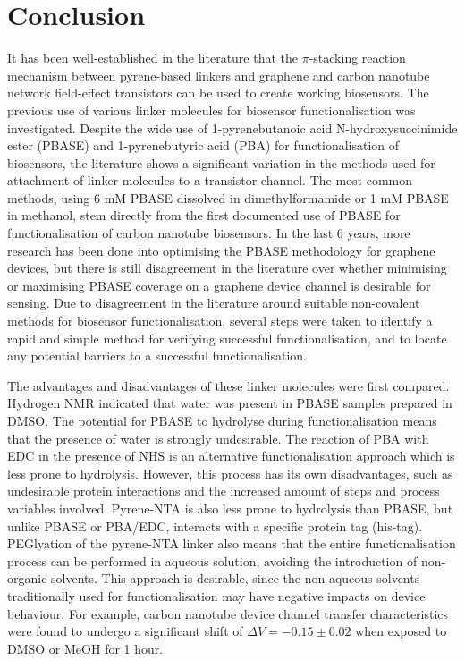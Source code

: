 \documentclass[
  a4paper,
]{scrbook}
\begin{document}
\hypertarget{sec-conclusion}{%
\section{Conclusion}\label{sec-conclusion}}

It has been well-established in the literature that the \(\pi\)-stacking
reaction mechanism between pyrene-based linkers and graphene and carbon
nanotube network field-effect transistors can be used to create working
biosensors. The previous use of various linker molecules for biosensor
functionalisation was investigated. Despite the wide use of
1-pyrenebutanoic acid N-hydroxysuccinimide ester (PBASE) and
1-pyrenebutyric acid (PBA) for functionalisation of biosensors, the
literature shows a significant variation in the methods used for
attachment of linker molecules to a transistor channel. The most common
methods, using 6 mM PBASE dissolved in dimethylformamide or 1 mM PBASE
in methanol, stem directly from the first documented use of PBASE for
functionalisation of carbon nanotube biosensors. In the last 6 years,
more research has been done into optimising the PBASE methodology for
graphene devices, but there is still disagreement in the literature over
whether minimising or maximising PBASE coverage on a graphene device
channel is desirable for sensing. Due to disagreement in the literature
around suitable non-covalent methods for biosensor functionalisation,
several steps were taken to identify a rapid and simple method for
verifying successful functionalisation, and to locate any potential
barriers to a successful functionalisation.

The advantages and disadvantages of these linker molecules were first
compared. Hydrogen NMR indicated that water was present in PBASE samples
prepared in DMSO. The potential for PBASE to hydrolyse during
functionalisation means that the presence of water is strongly
undesirable. The reaction of PBA with EDC in the presence of NHS is an
alternative functionalisation approach which is less prone to
hydrolysis. However, this process has its own disadvantages, such as
undesirable protein interactions and the increased amount of steps and
process variables involved. Pyrene-NTA is also less prone to hydrolysis
than PBASE, but unlike PBASE or PBA/EDC, interacts with a specific
protein tag (his-tag). PEGlyation of the pyrene-NTA linker also means
that the entire functionalisation process can be performed in aqueous
solution, avoiding the introduction of non-organic solvents. This
approach is desirable, since the non-aqueous solvents traditionally used
for functionalisation may have negative impacts on device behaviour. For
example, carbon nanotube device channel transfer characteristics were
found to undergo a significant shift of \(\Delta V = -0.15 \pm 0.02\)
when exposed to DMSO or MeOH for 1 hour.
\end{document}
